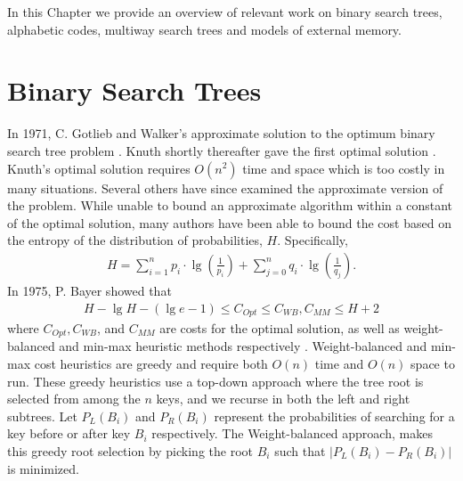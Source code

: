 \documentclass[letterpaper,12pt,titlepage,oneside,final]{book}
\theoremstyle{plain}
\begin{document}
In this Chapter we provide an overview of relevant work on binary search trees, alphabetic codes, multiway search trees and models of external memory.

\section{Binary Search Trees}

In 1971, C. Gotlieb and Walker's approximate solution to the optimum binary search tree problem \cite{walker1971top}. Knuth shortly thereafter gave the first optimal solution \cite{knuth1971optimum}. Knuth's optimal solution requires $O(n^2)$ time and space which is too costly in many situations. Several others have since examined the approximate version of the problem. While unable to bound an approximate algorithm within a constant of the optimal solution, many authors have been able to bound the cost based on the entropy of the distribution of probabilities, $H$. Specifically, 
\begin{align*}
H = \sum_{i=1}^{n} p_i\cdot\lg(\frac{1}{p_i}) + \sum_{j=0}^{n} q_i\cdot\lg(\frac{1}{q_j}).
\end{align*}
In 1975, P. Bayer showed that 
\begin{align*}
H-\lg H-(\lg e-1) \leq C_{Opt} \leq C_{WB}, C_{MM} \leq H + 2
\end{align*}
where $C_{Opt}, C_{WB}$, and $C_{MM}$ are costs for the optimal solution, as well as weight-balanced and min-max heuristic methods respectively \cite{bayer1975improved}. Weight-balanced and min-max cost heuristics are greedy and require both $O(n)$ time and $O(n)$ space to run. These greedy heuristics use a top-down approach where the tree root is selected from among the $n$ keys, and we recurse in both the left and right subtrees. Let $P_L(B_i)$ and $P_R(B_i)$ represent the probabilities of searching for a key before or after key $B_i$ respectively. The Weight-balanced approach, makes this greedy root selection by picking the root $B_i$ such that $|P_L(B_i)-P_R(B_i)|$ is minimized.
\end{document}
